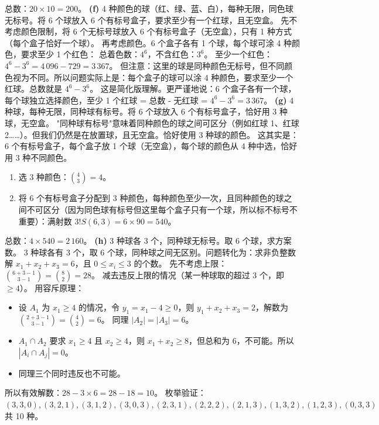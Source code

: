 \documentclass[10pt,a4paper,openany]{ctexbook}
\theoremstyle{definition}
\theoremstyle{remark}
\begin{document}
总数：$20 \times 10 = 200$。
\textbf{(f)} 4 种颜色的球（红、绿、蓝、白），每种无限，同色球无标号。将 6 个球放入 6 个有标号盒子，要求至少有一个红球，且无空盒。
先不考虑颜色限制，将 6 个无标号球放入 6 个有标号盒子（无空盒），只有 1 种方式（每个盒子恰好一个球）。
再考虑颜色。6 个盒子各有 1 个球，每个球可涂 4 种颜色，要求至少 1 个红色：
总着色数：$4^6$，不含红色：$3^6$。
至少一个红色：$4^6 - 3^6 = 4\,096 - 729 = 3\,367$。
但注意：这里的球是同种颜色无标号，但不同颜色视为不同。所以问题实际上是：每个盒子的球可以涂 4 种颜色，要求至少一个红球。总数就是 $4^6 - 3^6$。
这是简化版理解。更严谨地说：6 个盒子各有一个球，每个球独立选择颜色，至少 1 个红球 = 总数 - 无红球 = $4^6 - 3^6 = 3\,367$。
\textbf{(g)} 4 种球，每种无限，同种球有标号。将 6 个球放入 6 个有标号盒子，恰好用 3 种球，无空盒。
"同种球有标号"意味着同种颜色的球之间可区分（例如红球 1、红球 2……）。但我们仍然是在放置球，且无空盒。恰好使用 3 种球的颜色。
这其实是：6 个有标号盒子，每个盒子放 1 个球（无空盒），每个球的颜色从 4 种中选，恰好用 3 种不同颜色。
\begin{enumerate}
\item 选 3 种颜色：$\binom{4}{3} = 4$。
\item 将 6 个有标号盒子分配到 3 种颜色，每种颜色至少一次，且同种颜色的球之间不可区分（因为同色球有标号但这里每个盒子只有一个球，所以标不标号不重要）：满射数 $3! S(6,3) = 6 \times 90 = 540$。

\end{enumerate}

总数：$4 \times 540 = 2\,160$。
\textbf{(h)} 3 种球各 3 个，同种球无标号。取 6 个球，求方案数。
3 种球各有 3 个，取 6 个球，同种球之间无区别。问题转化为：求非负整数解 $x_1 + x_2 + x_3 = 6$，且 $0 \leq x_i \leq 3$ 的个数。
先不考虑上限：$\binom{6+3-1}{3-1} = \binom{8}{2} = 28$。
减去违反上限的情况（某一种球取的超过 3 个，即 $\geq 4$）。
用容斥原理：
\begin{itemize}
\item 设 $A_1$ 为 $x_1 \geq 4$ 的情况，令 $y_1 = x_1 - 4 \geq 0$，则 $y_1 + x_2 + x_3 = 2$，解数为 $\binom{2+3-1}{3-1} = \binom{4}{2} = 6$。
同理 $|A_2| = |A_3| = 6$。

\item $A_1 \cap A_2$ 要求 $x_1 \geq 4$ 且 $x_2 \geq 4$，则 $x_1 + x_2 \geq 8$，但总和为 6，不可能。所以 $|A_i \cap A_j| = 0$。
\item 同理三个同时违反也不可能。

\end{itemize}

所以有效解数：$28 - 3 \times 6 = 28 - 18 = 10$。
枚举验证：$(3,3,0), (3,2,1), (3,1,2), (3,0,3), (2,3,1), (2,2,2), (2,1,3), (1,3,2), (1,2,3), (0,3,3)$ 共 10 种。
\vspace{-2pt}
\end{document}
